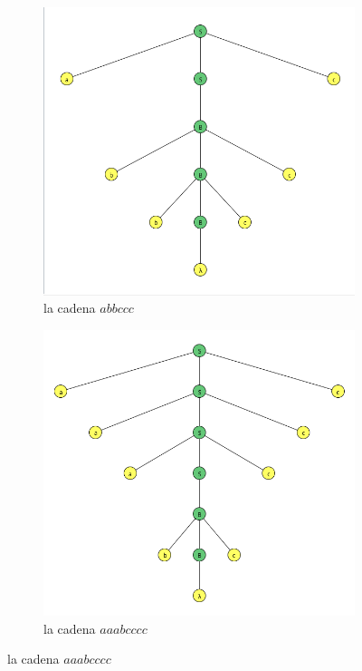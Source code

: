\documentclass{article}
\begin{document}
\begin{flushleft}
\begin{enumerate}
\begin{figure}[h]
\begin{subfigure}[b]{0.45\textwidth}
                        \includegraphics[width=\textwidth]{./Imagenes/grafo12.png}
                        \caption{la cadena $abbccc$}
                        \label{fig:label24}
                    \end{subfigure}
                    \hfill
                    \begin{subfigure}[b]{0.45\textwidth}
                        \centering
                        \includegraphics[width=\textwidth]{./Imagenes/grafo13.png}
                        \caption{la cadena $aaabcccc$}
                        \label{fig:label25}
                    \end{subfigure}
                    \label{fig:matrix6}
                \end{figure}


            \end{enumerate}
        \end{flushleft}
\end{document}
